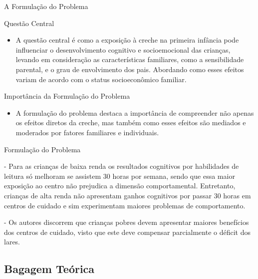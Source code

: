 \documentclass[10pt]{Beamer}
\begin{document}
	
\begin{frame}{A Formulação do Problema}
	
\begin{block}{Questão Central}
\begin{itemize}
\item A questão central é como a exposição à creche na primeira infância pode influenciar o desenvolvimento cognitivo e socioemocional das crianças, levando em consideração as características familiares, como a sensibilidade parental, e o grau de envolvimento dos pais. Abordando como esses efeitos variam de acordo com o status socioeconômico familiar.
\end{itemize}
\end{block}
	
\vskip0.5cm
	
\begin{block}{Importância da Formulação do Problema}
\begin{itemize}
\item A formulação do problema destaca a importância de compreender não apenas os efeitos diretos da creche, mas também como esses efeitos são mediados e moderados por fatores familiares e individuais.
\end{itemize}
\end{block}
	
\end{frame}



\begin{frame}{Formulação do Problema}
\begin{tcolorbox}[drop fuzzy shadow=ShadowColor]
- Para as crianças de baixa renda os resultados cognitivos por habilidades de leitura só melhoram se assistem 30 horas por semana, sendo que essa maior exposição ao centro não prejudica a dimensão comportamental. Entretanto, crianças de alta renda não apresentam ganhos cognitivos por passar 30 horas em centros de cuidado e sim experimentam maiores problemas de comportamento.

- Os autores discorrem que crianças pobres devem apresentar maiores benefícios dos centros de cuidado, visto que este deve compensar parcialmente o déficit dos lares.
\end{tcolorbox}

\end{frame}


	\subsection{Bagagem Teórica}
	
\end{document}
